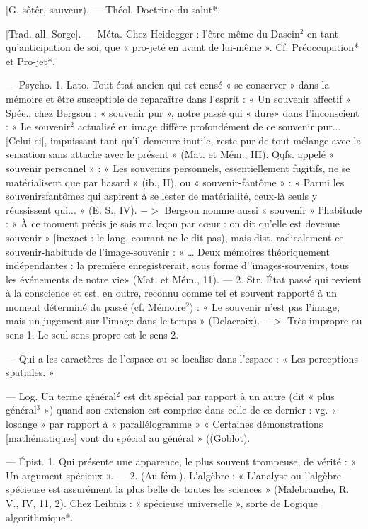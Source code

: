 \begin{itemize}[leftmargin=1cm, label=, itemsep=1pt]
 [G. sôtêr, sauveur). —
Théol. Doctrine du salut*.

 [Trad. all. Sorge]. — Méta. Chez
Heidegger : l'être même du Dasein$^2$
en tant qu’anticipation de soi, que
« pro-jeté en avant de lui-même ».
Cf. Préoccupation* et Pro-jet*.

 — Psycho. 1. Lato. Tout état
ancien qui est censé « se conserver »
dans la mémoire et être susceptible
de reparaître dans l'esprit : « Un
souvenir affectif » Spée., chez
Bergson : « souvenir pur », notre
passé qui « dure» dans l'inconscient :
« Le souvenir$^2$ actualisé en image
diffère profondément de ce souvenir pur... [Celui-ci], impuissant
tant qu'il demeure inutile, reste
pur de tout mélange avec la sensation sans attache avec le présent »
(Mat. et Mém., III). Qqfs. appelé
« souvenir personnel » : « Les souvenirs personnels, essentiellement
fugitifs, ne se matérialisent que par
hasard » (ib., II), ou « souvenir-fantôme » : « Parmi les souvenirsfantômes qui aspirent à se lester de
matérialité, ceux-là seuls y réussissent qui... » (E. S., IV). $->$ Bergson
nomme aussi « souvenir » l'habitude : « À ce moment précis je sais
ma leçon par cœur : on dit qu’elle
est devenue souvenir » [inexact : le
lang. courant ne le dit pas), mais
dist. radicalement ce souvenir-habitude de l'image-souvenir : « … Deux
mémoires théoriquement indépendantes : la première enregistrerait,
sous forme d’'images-souvenirs, tous
les événements de notre vie» (Mat. et
Mém., 11). — 2. Str. État passé qui
revient à la conscience et est, en
outre, reconnu comme tel et souvent rapporté à un moment déterminé du passé (cf. Mémoire$^2$) : « Le
souvenir n’est pas l’image, mais un
jugement sur l’image dans le temps »
(Delacroix). $->$ Très impropre au
sens 1. Le seul sens propre est le
sens 2.

 — Qui a les caractères de
l’espace ou se localise dans l’espace :
« Les perceptions spatiales. »

 — Log. Un terme général$^2$ est
dit spécial par rapport à un autre
(dit « plus général$^3$ ») quand son
extension est comprise dans celle
de ce dernier : vg. « losange » par
rapport à « parallélogramme »
« Certaines démonstrations [mathématiques] vont du spécial au
général » ((Goblot).

 — Épist. 1. Qui présente une
apparence, le plus souvent trompeuse, de vérité : « Un argument
spécieux ». — 2. (Au fém.). L’algèbre :
« L'analyse ou l’algèbre spécieuse est assurément la plus belle
de toutes les sciences » (Malebranche, R. V., IV, 11, 2). Chez Leibniz :
« spécieuse universelle », sorte de
Logique algorithmique*.


\end{itemize}
